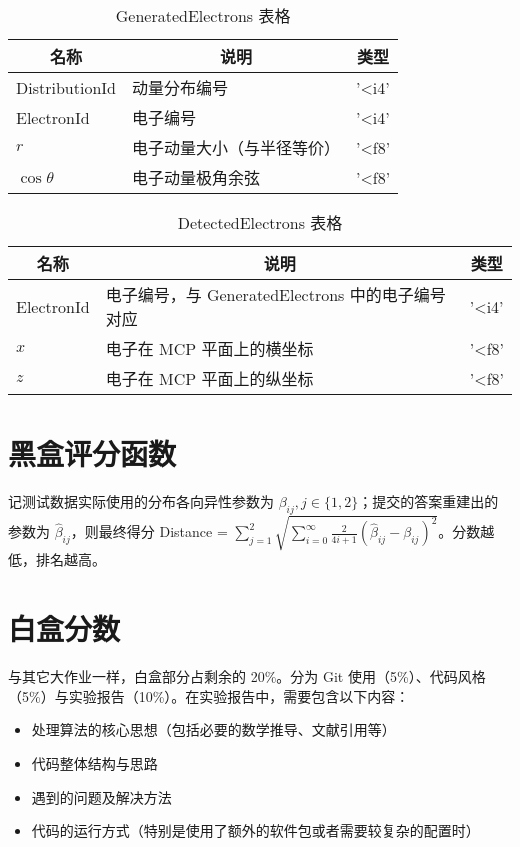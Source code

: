 \documentclass{article}
\begin{document}
\begin{table}[H]
    \caption{GeneratedElectrons 表格}
        \label{tab:GeneratedElectrons2}
        \centering
        {
            \begin{tabular}[c]{l|l|l}
                \hline
                \multicolumn{1}{c|}{\textbf{名称}} & 
                \multicolumn{1}{c|}{\textbf{说明}} & 
                \multicolumn{1}{c}{\textbf{类型}} \\
                \hline
                DistributionId & 动量分布编号 & '<i4' \\
                ElectronId & 电子编号 & '<i4' \\
                $r$ & 电子动量大小（与半径等价） & '<f8' \\
                $\cos\theta$ & 电子动量极角余弦 & '<f8' \\
                \hline
            \end{tabular}
        }
\end{table}

\begin{table}[H]
    \caption{DetectedElectrons 表格}
        \label{tab:DetectedElectrons2}
        \centering
        {
            \begin{tabular}[c]{l|l|l}
                \hline
                \multicolumn{1}{c|}{\textbf{名称}} & 
                \multicolumn{1}{c|}{\textbf{说明}} & 
                \multicolumn{1}{c}{\textbf{类型}} \\
                \hline
                ElectronId & 电子编号，与 GeneratedElectrons 中的电子编号对应 & '<i4' \\
                $x$ & 电子在 MCP 平面上的横坐标 & '<f8' \\
                $z$ & 电子在 MCP 平面上的纵坐标 & '<f8' \\
                \hline
            \end{tabular}
        }
\end{table}




\section{黑盒评分函数} %
\label{sec:黑盒评分函数}
记测试数据实际使用的分布各向异性参数为 $\beta_{ij}, j\in \{1,2\}$；提交的答案重建出的参数为 $\hat{\beta}_{ij}$，则最终得分 Distance = $\displaystyle\sum_{j=1}^{2}\sqrt{\sum_{i=0}^{\infty} \frac{2}{4i+1} \left( \hat{\beta}_{ij} - \beta_{ij} \right)^2}$。分数越低，排名越高。

\section{白盒分数} %
\label{sec:白盒分数}
与其它大作业一样，白盒部分占剩余的 20\%。分为 Git 使用（5\%）、代码风格（5\%）与实验报告（10\%）。在实验报告中，需要包含以下内容：
\begin{itemize}
    \item 处理算法的核心思想（包括必要的数学推导、文献引用等）
    \item 代码整体结构与思路
    \item 遇到的问题及解决方法
    \item 代码的运行方式（特别是使用了额外的软件包或者需要较复杂的配置时）
\end{itemize}
    
\end{document}
